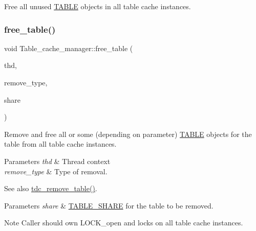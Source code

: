 Free all unused \mbox{\hyperlink{structTABLE}{T\+A\+B\+LE}} objects in all table cache instances. \mbox{\label{classTable__cache__manager_ab52f0773a6d18d64609aa52e042ce4dc}} 
\subsubsection{\texorpdfstring{free\+\_\+table()}{free\_table()}}
{\footnotesize\ttfamily void Table\+\_\+cache\+\_\+manager\+::free\+\_\+table (\begin{DoxyParamCaption}\item[{T\+HD $\ast$}]{thd,  }\item[{enum\+\_\+tdc\+\_\+remove\+\_\+table\+\_\+type}]{remove\+\_\+type,  }\item[{\mbox{\hyperlink{structTABLE__SHARE}{T\+A\+B\+L\+E\+\_\+\+S\+H\+A\+RE}} $\ast$}]{share }\end{DoxyParamCaption})}

Remove and free all or some (depending on parameter) \mbox{\hyperlink{structTABLE}{T\+A\+B\+LE}} objects for the table from all table cache instances.


\begin{DoxyParams}{Parameters}
{\em thd} & Thread context \\
\hline
{\em remove\+\_\+type} & Type of removal. \\
\hline
\end{DoxyParams}
\begin{DoxySeeAlso}{See also}
\mbox{\hyperlink{group__Data__Dictionary_ga8faf6c6118b6677394e14994ae614075}{tdc\+\_\+remove\+\_\+table()}}. 
\end{DoxySeeAlso}

\begin{DoxyParams}{Parameters}
{\em share} & \mbox{\hyperlink{structTABLE__SHARE}{T\+A\+B\+L\+E\+\_\+\+S\+H\+A\+RE}} for the table to be removed.\\
\hline
\end{DoxyParams}
\begin{DoxyNote}{Note}
Caller should own L\+O\+C\+K\+\_\+open and locks on all table cache instances. 
\end{DoxyNote}
\mbox{\label{classTable__cache__manager_a39f254e5a07c0c99075b95042a4f211c}} 
